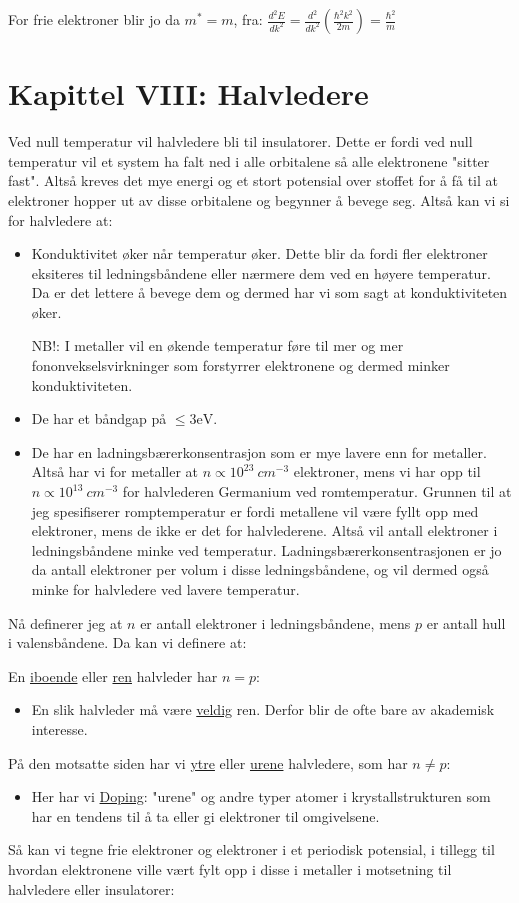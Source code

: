 \documentclass{article}
\begin{document}
For frie elektroner blir jo da $m^* = m$, fra: $\frac{d^2 E}{dk^2} = \frac{d^2}{dk^2} \left(\frac{\hbar^2 k^2}{2m}\right) = \frac{\hbar^2}{m}$

\newpage
\section{Kapittel VIII: Halvledere}
Ved null temperatur vil halvledere bli til insulatorer. Dette er fordi ved null temperatur vil et system ha falt ned i alle orbitalene så alle elektronene "sitter fast". Altså kreves det mye energi og et stort potensial over stoffet for å få til at elektroner hopper ut av disse orbitalene og begynner å bevege seg. 
Altså kan vi si for halvledere at:
\begin{itemize}
  \item Konduktivitet øker når temperatur øker. Dette blir da fordi fler elektroner eksiteres til ledningsbåndene eller nærmere dem ved en høyere temperatur. Da er det lettere å bevege dem og dermed har vi som sagt at konduktiviteten øker.
  
  NB!: I metaller vil en økende temperatur føre til mer og mer fononvekselsvirkninger som forstyrrer elektronene og dermed minker konduktiviteten.
  \item De har et båndgap på $\le 3 \text{eV}$.
  \item De har en ladningsbærerkonsentrasjon som er mye lavere enn for metaller. Altså har vi for metaller at $n \propto 10^{23} \ cm^{-3}$ elektroner, mens vi har opp til $n \propto 10^{13} \ cm^{-3}$ for halvlederen Germanium ved romtemperatur. Grunnen til at jeg spesifiserer romptemperatur er fordi metallene vil være fyllt opp med elektroner, mens de ikke er det for halvlederene. Altså vil antall elektroner i ledningsbåndene minke ved temperatur. Ladningsbærerkonsentrasjonen er jo da antall elektroner per volum i disse ledningsbåndene, og vil dermed også minke for halvledere ved lavere temperatur.
\end{itemize}
Nå definerer jeg at $n$ er antall elektroner i ledningsbåndene, mens $p$ er antall hull i valensbåndene. Da kan vi definere at:

En \underline{iboende} eller \underline{ren} halvleder har $n = p$:
\begin{itemize}
  \item En slik halvleder må være \underline{veldig} ren. Derfor blir de ofte bare av akademisk interesse.
\end{itemize}
På den motsatte siden har vi \underline{ytre} eller \underline{urene} halvledere, som har $n \ne p$:
\begin{itemize}
  \item Her har vi \underline{Doping}: "urene" og andre typer atomer i krystallstrukturen som har en tendens til å ta eller gi elektroner til omgivelsene.
\end{itemize}
Så kan vi tegne frie elektroner og elektroner i et periodisk potensial, i tillegg til hvordan elektronene ville vært fylt opp i disse i metaller i motsetning til halvledere eller insulatorer:
\end{document}
